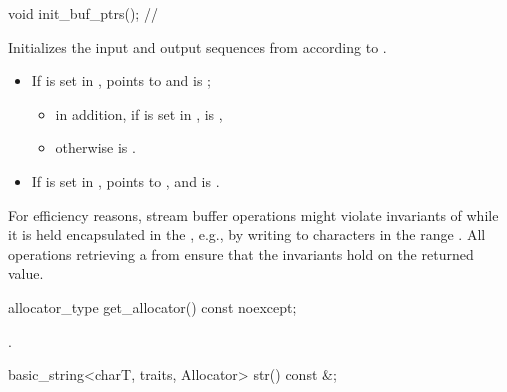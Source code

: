 \begin{itemdecl}
void init_buf_ptrs(); // \expos
\end{itemdecl}

\begin{itemdescr}
\pnum
\effects
Initializes the input and output sequences from 
according to .

\pnum
\ensures
\begin{itemize}
\item If  is set in ,
   points to  and
   is ;
  \begin{itemize}
  \item in addition, if  is set in ,
     is ,
  \item otherwise  is .
  \end{itemize}
\item If  is set in ,
   points to , and
  is .
\end{itemize}

\pnum
\begin{note}
For efficiency reasons,
stream buffer operations might violate invariants of 
while it is held encapsulated in the ,
e.g., by writing to characters in the range
.
All operations retrieving a  from 
ensure that the  invariants hold on the returned value.
\end{note}
\end{itemdescr}

%
\begin{itemdecl}
allocator_type get_allocator() const noexcept;
\end{itemdecl}

\begin{itemdescr}
\pnum
\returns
{}.
\end{itemdescr}

%
\begin{itemdecl}
basic_string<charT, traits, Allocator> str() const &;
\end{itemdecl}

